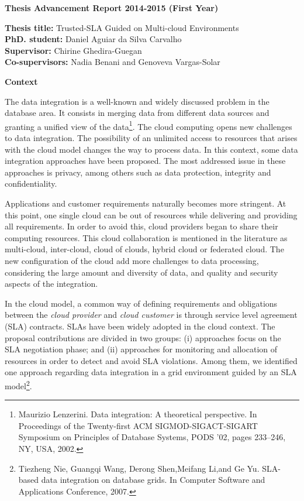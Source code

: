 \documentclass[12pt,a4paper,oneside]{report}
\author{Daniel Aguiar da Silva Carvalho}
\begin{document}
\sffamily
\begin{center}
\textbf{\large{Thesis Advancement Report 2014-2015 (First Year)}}
\end{center}

\begin{flushleft}
\textbf{Thesis title:} Trusted-SLA Guided on Multi-cloud Environments \\
\textbf{PhD. student:} Daniel Aguiar da Silva Carvalho \\
\textbf{Supervisor:} Chirine Ghedira-Guegan \\ 
\textbf{Co-supervisors:} Nadia Benani and Genoveva Vargas-Solar
\end{flushleft}

\begin{flushleft}
\textbf{Context}\\
\end{flushleft}

The data integration is a well-known and widely discussed problem in the database area. 
It consists in merging data from different data sources and granting a unified view of the data\footnote{Maurizio Lenzerini. Data integration: A theoretical perspective. In Proceedings of the Twenty-first ACM SIGMOD-SIGACT-SIGART Symposium on Principles of Database Systems, PODS ’02, pages 233–246, NY, USA, 2002.}. 
The cloud computing opens new challenges to data integration. The possibility of an unlimited access to resources that arises with the cloud model changes the way to process data.
In this context, some data integration approaches have been proposed.
The most addressed issue in these approaches is privacy, among others such as data protection, integrity and confidentiality. 

Applications and customer requirements naturally becomes more stringent. 
At this point, one single cloud can be out of resources while delivering and providing all requirements. 
In order to avoid this, cloud providers began to share their computing resources. 
This cloud collaboration is mentioned in the literature as multi-cloud, inter-cloud, cloud of clouds, hybrid cloud or federated cloud.
The new configuration of the cloud add more challenges to data processing, considering the large amount and diversity of data, and quality and security aspects of the integration.

In the cloud model, a common way of defining requirements and obligations between the \textit{cloud provider} and \textit{cloud customer} is through service level agreement (SLA) contracts. 
SLAs have been widely adopted in the cloud context. 
The proposal contributions are divided in two groups: (i) approaches focus on the SLA negotiation phase; and (ii) approaches for monitoring and allocation of resources in order to detect and avoid SLA violations. Among them, we identified one approach regarding data integration in a grid environment guided by an SLA model\footnote{Tiezheng Nie, Guangqi Wang, Derong Shen,Meifang Li,and Ge Yu. SLA-based data integration on database grids. In Computer Software and Applications Conference, 2007.}.
\end{document}
